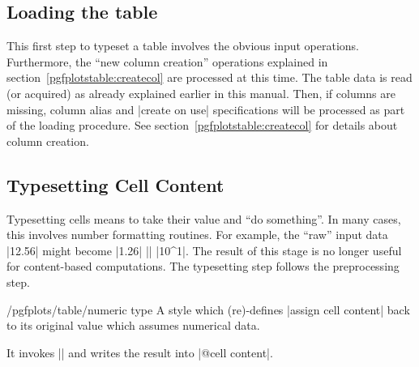 \subsection{Loading the table}
This first step to typeset a table involves the obvious input operations. Furthermore, the ``new column creation'' operations explained in section~\ref{pgfplotstable:createcol} are processed at this time. The table data is read (or acquired) as already explained earlier in this manual. Then, if columns are missing, column alias and |create on use| specifications will be processed as part of the loading procedure. See section~\ref{pgfplotstable:createcol} for details about column creation.

\subsection{Typesetting Cell Content}
Typesetting cells means to take their value and ``do something''. In many cases, this involves number formatting routines. For example, the ``raw'' input data |12.56| might become |1.26| |\cdot| |10^1|. The result of this stage is no longer useful for content-based computations. The typesetting step follows the preprocessing step.


\begin{stylekey}{/pgfplots/table/numeric type}
	A style which (re)-defines |assign cell content| back to its original value which assumes numerical data.

	It invokes |\pgfmathprintnumberto| and writes the result into |@cell content|.
\end{stylekey}

